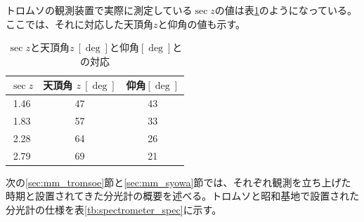 トロムソの観測装置で実際に測定している$\sec z$の値は表\ref{tb:secz_zdeg}のようになっている。
ここでは、それに対応した天頂角$z$と仰角の値も示す。
\begin{table}[htbp]
    \centering
    \caption{$\sec z$と天頂角$z\ [ \deg ]$と仰角$[ \deg ]$との対応}
    \label{tb:secz_zdeg}
    \setlength{\belowcaptionskip}{5mm}
    \begin{tabular}{ccc}
    \hline
    $\sec z$ & 天頂角 $z\ [ \deg ]$ & 仰角$[ \deg ]$ \\ \hline
    1.46     & 47                & 43           \\ \hline
    1.83     & 57                & 33           \\ \hline
    2.28     & 64                & 26           \\ \hline
    2.79     & 69                & 21           \\ \hline
    \end{tabular}
\end{table}
次の\ref{sec:mm_tromsoe}節と\ref{sec:mm_syowa}節では、それぞれ観測を立ち上げた時期と設置されてきた分光計の概要を述べる。トロムソと昭和基地で設置された分光計の仕様を表\ref{tb:spectrometer_spec}に示す。
